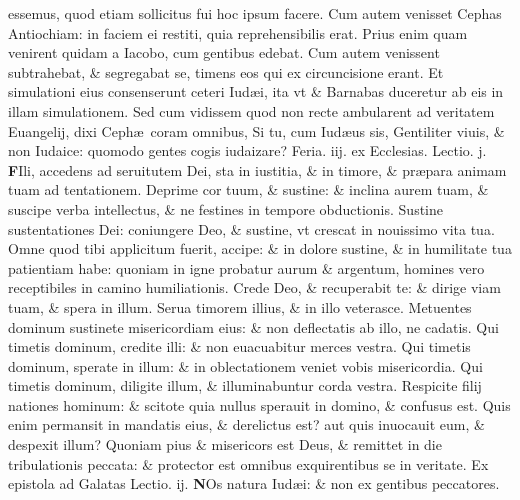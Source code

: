 \documentclass[a5paper,10pt]{book}
\def\leftmarginnote{%
	\lrmarginnote{\hskip -\marginparsep \hskip -6.5em}}
\def\rightmarginnote{%
	\lrmarginnote{\hskip\columnwidth \hskip -1em}}
\def\ae{æ}
\begin{document}
\begin{multicols*}{2}
essemus, quod etiam sollicitus fui hoc ipsum facere.
Cum autem venisset Cephas Antiochiam: in faciem ei restiti, quia reprehensibilis erat. Prius enim quam venirent quidam a Iacobo, cum gentibus edebat.
Cum autem venissent subtrahebat, \& segregabat se, timens eos qui ex circuncisione erant. Et simulationi eius consenserunt ceteri Iud\ae i, ita vt \& Barnabas duceretur ab eis in illam simulationem.
Sed cum vidissem quod non recte ambularent ad veritatem Euangelij, dixi Ceph\ae \ coram omnibus, Si tu, cum Iud\ae us sis, Gentiliter viuis, \& non Iudaice: quomodo gentes cogis iudaizare?
\newline {} \color{red} \hypertarget{TUE-PRIMA-VAGAN}{Feria. iij.} ex Ecclesias. Lectio. j. \color{black}
\vspace{-.25em}
\lettrine[lines=2]{\bfseries F}{}Ili,\leftmarginnote{\begin{flushright}ca. 2.\end{flushright}} accedens ad seruitutem Dei, sta in iustitia, \& in timore, \& pr\ae para animam tuam ad tentationem.
Deprime cor tuum, \& sustine: \& inclina aurem tuam, \& suscipe verba intellectus, \& ne festines in tempore obductionis.
Sustine sustentationes Dei: coniungere Deo, \& sustine, vt crescat in nouissimo vita tua. Omne quod tibi applicitum fuerit, accipe: \& in dolore sustine, \& in humilitate tua patientiam habe: quoniam in igne probatur aurum \& argentum, homines vero receptibiles in camino humiliationis.
Crede Deo, \& recuperabit te: \& dirige viam tuam, \& spera in illum. Serua timorem illius, \& in illo veterasce.
Metuentes dominum sustinete misericordiam eius: \& non deflectatis ab illo, ne cadatis. Qui timetis dominum, credite illi: \& non euacuabitur merces vestra.
Qui timetis dominum, sperate in illum: \& in oblectationem veniet vobis misericordia. Qui timetis dominum, diligite illum, \& illuminabuntur corda vestra.
Respicite filij nationes hominum: \& scitote quia nullus sperauit in domino, \& confusus est. Quis enim permansit in mandatis eius, \& derelictus est? aut quis inuocauit eum, \& despexit illum?
Quoniam pius \& misericors est Deus, \& remittet in die tribulationis peccata: \& protector est omnibus exquirentibus se in veritate.
\fancyhead[C]{\color{red} Feria. iij. Dominic\ae . j. Vagantium}
\newline \color{red} Ex epistola ad Galatas \hfill Lectio. ij. \color{black}
\vspace{-.25em}
\lettrine[lines=2]{\bfseries \color{red} N}{}Os\rightmarginnote{ca. 2.} natura Iud\ae i: \& non ex gentibus peccatores.

\end{multicols*}
\end{document}
